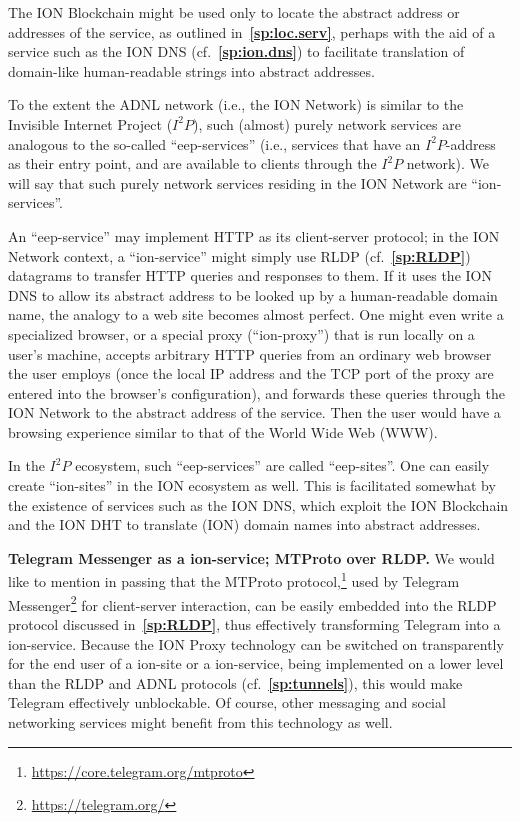 \documentclass[12pt,oneside]{article}
\def\makepoint#1{\medbreak\noindent{\bf #1.\ }}
\def\nxsubpoint{\refstepcounter{subsubsection}%
  \smallbreak\makepoint{\thesubsubsection}}
\def\refpoint#1{{\rm\textbf{\ref{#1}}}}
\let\ptref=\refpoint
\def\embt(#1.){\textbf{#1.}}
\begin{document}
The ION Blockchain might be used only to locate the abstract address
or addresses of the service, as outlined in~\ptref{sp:loc.serv},
perhaps with the aid of a service such as the ION DNS
(cf.~\ptref{sp:ion.dns}) to facilitate translation of domain-like
human-readable strings into abstract addresses.

To the extent the ADNL network (i.e., the ION Network) is similar to
the Invisible Internet Project ($I^2P$), such (almost) purely network
services are analogous to the so-called ``eep-services'' (i.e.,
services that have an $I^2P$-address as their entry point, and are
available to clients through the $I^2P$ network). We will say that
such purely network services residing in the ION Network are
``ion-services''.

An ``eep-service'' may implement HTTP as its client-server protocol;
in the ION Network context, a ``ion-service'' might simply use RLDP
(cf.~\ptref{sp:RLDP}) datagrams to transfer HTTP queries and responses
to them. If it uses the ION DNS to allow its abstract address to be
looked up by a human-readable domain name, the analogy to a web site
becomes almost perfect. One might even write a specialized browser, or
a special proxy (``ion-proxy'') that is run locally on a user's
machine, accepts arbitrary HTTP queries from an ordinary web browser
the user employs (once the local IP address and the TCP port of the
proxy are entered into the browser's configuration), and forwards
these queries through the ION Network to the abstract address of the
service. Then the user would have a browsing experience similar to
that of the World Wide Web (WWW).

In the $I^2P$ ecosystem, such ``eep-services'' are called
``eep-sites''. One can easily create ``ion-sites'' in the ION
ecosystem as well. This is facilitated somewhat by the existence of
services such as the ION DNS, which exploit the ION Blockchain and the
ION DHT to translate (ION) domain names into abstract addresses.

\nxsubpoint\label{sp:telegram.ion.serv} \embt(Telegram Messenger as a
ion-service; MTProto over RLDP.)  We would like to mention in passing
that the MTProto
protocol,\footnote{\url{https://core.telegram.org/mtproto}} used by
Telegram Messenger\footnote{\url{https://telegram.org/}} for
client-server interaction, can be easily embedded into the RLDP
protocol discussed in~\ptref{sp:RLDP}, thus effectively transforming
Telegram into a ion-service. Because the ION Proxy technology can be
switched on transparently for the end user of a ion-site or a
ion-service, being implemented on a lower level than the RLDP and ADNL
protocols (cf.~\ptref{sp:tunnels}), this would make Telegram
effectively unblockable. Of course, other messaging and social
networking services might benefit from this technology as well.
\end{document}
